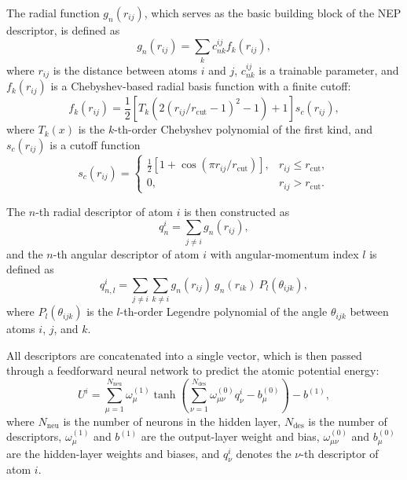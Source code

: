 \documentclass[aip,graphicx,amsmath,amssymb]{revtex4-1}
\begin{document}
The radial function $g_n(r_{ij})$, which serves as the basic building block of the NEP
descriptor, is defined as
\begin{equation}
g_n(r_{ij}) = \sum_{k} c^{ij}_{nk} f_k(r_{ij}),
\end{equation}
where $r_{ij}$ is the distance between atoms $i$ and $j$, 
$c^{ij}_{nk}$ is a trainable parameter, and $f_k(r_{ij})$ is a Chebyshev-based
radial basis function with a finite cutoff:
\begin{equation}
f_k(r_{ij}) = \frac{1}{2}\!\left[T_k\!\!\left(2(r_{ij}/r_{\mathrm{cut}} - 1)^2 - 1\right)+1\right] s_c(r_{ij}),
\end{equation}
where $T_k(x)$ is the $k$-th-order Chebyshev polynomial of the first kind, and 
$s_c(r_{ij})$ is a cutoff function
\begin{equation}
s_c(r_{ij}) =
\begin{cases}
  \frac{1}{2}\!\left[1+\cos(\pi r_{ij}/r_{\mathrm{cut}})\right], & r_{ij} \le r_{\mathrm{cut}}, \\
  0, & r_{ij} > r_{\mathrm{cut}}.
\end{cases}
\end{equation}

The $n$-th radial descriptor of atom $i$ is then constructed as
\begin{equation}
q_n^i = \sum_{j \ne i} g_n(r_{ij}),
\end{equation}
and the $n$-th angular descriptor of atom $i$ with angular-momentum index $l$
is defined as
\begin{equation}
q_{n,l}^i = \sum_{j \ne i}\sum_{k \ne i} g_n(r_{ij})~g_n(r_{ik})~P_l(\theta_{ijk}),
\end{equation}
where $P_l(\theta_{ijk})$ is the $l$-th-order Legendre polynomial of the angle
$\theta_{ijk}$ between atoms $i$, $j$, and $k$.

All descriptors are concatenated into a single vector, which is then passed
through a feedforward neural network to predict the atomic potential energy:
\begin{equation}
U^i =
\sum_{\mu=1}^{N_{\mathrm{neu}}}
\omega^{(1)}_\mu
\tanh\!\left(
\sum_{\nu=1}^{N_{\mathrm{des}}}
\omega^{(0)}_{\mu\nu} q^i_\nu - b^{(0)}_\mu
\right)
- b^{(1)},
\end{equation}
where $N_{\mathrm{neu}}$ is the number of neurons in the hidden layer,
$N_{\mathrm{des}}$ is the number of descriptors,
$\omega^{(1)}_\mu$ and $b^{(1)}$ are the output-layer weight and bias,
$\omega^{(0)}_{\mu\nu}$ and $b^{(0)}_\mu$ are the hidden-layer weights and biases,
and $q^i_\nu$ denotes the $\nu$-th descriptor of atom $i$.
\end{document}
